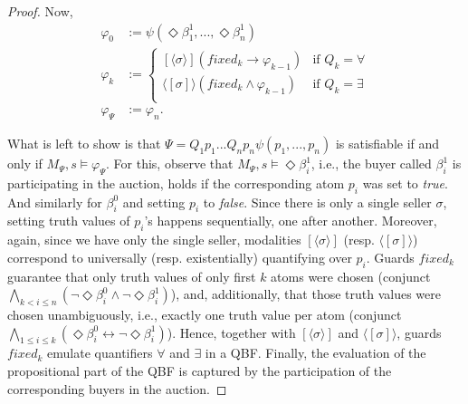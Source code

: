 \documentclass[letterpaper]{article} %
\theoremstyle{definition}
\begin{document}
\begin{proof}
    Now,
    \begin{align*}
    \varphi_0 &:= \psi(\Diamond \beta^1_1, ..., \Diamond \beta^1_n)\\
\varphi_k &:= 
\begin{cases} 
	[\! \langle \sigma \rangle \!] (fixed_k \to \varphi_{k-1}) &\text{if } Q_k = \forall\\
	\langle \! [ \sigma ] \! \rangle (fixed_k \land \varphi_{k-1}) &\text{if } Q_k = \exists\\
\end{cases}\\
\varphi_\Psi &:= \varphi_{n}.
\end{align*}

What is left to show is that $\Psi = Q_1 p_1 ... Q_n p_n \psi(p_1,...,p_n)$ is satisfiable if and only if $M_\Psi, s \models \varphi_\Psi$. For this, observe that $M_\Psi, s \models \Diamond \beta_i^1$, i.e., the buyer called $\beta^1_i$ is participating in the auction, holds if the corresponding atom $p_i$ was set to \textit{true}. And similarly for $\beta_i^0$ and setting $p_i$ to \textit{false}. Since there is only a single seller $\sigma$, setting truth values of $p_i$'s happens sequentially, one after another. Moreover, again, since we have only the single seller, modalities $[\! \langle \sigma \rangle \!]$ (resp. $\langle \! [ \sigma ] \! \rangle$) correspond to universally (resp. existentially) quantifying over $p_i$. Guards $fixed_k$ guarantee that only truth values of only first $k$ atoms were chosen (conjunct $\bigwedge_{k < i \leqslant n} (\lnot \Diamond \beta^0_i \land \lnot \Diamond \beta^1_i)$), and, additionally, that those truth values were chosen unambiguously, i.e., exactly one truth value per atom (conjunct $\bigwedge_{1 \leqslant i \leqslant k} (\Diamond \beta_i^0 \leftrightarrow \lnot \Diamond \beta_i^1)$). Hence, together with $[\! \langle \sigma \rangle \!]$ and $\langle \! [ \sigma ] \! \rangle$, guards $fixed_k$ emulate quantifiers $\forall$ and $\exists$ in a QBF. Finally, the evaluation of the propositional part of the QBF is captured by the participation of the corresponding buyers in the auction.   \fi  
\end{proof}

\end{document}
